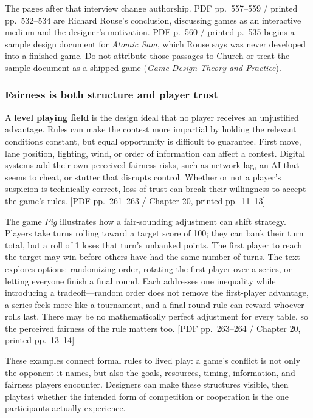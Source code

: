 The pages after that interview change authorship. PDF pp.~557--559 / printed pp.~532--534 are Richard Rouse's conclusion, discussing games as an interactive medium and the designer's motivation. PDF p.~560 / printed p.~535 begins a sample design document for \emph{Atomic Sam}, which Rouse says was never developed into a finished game. Do not attribute those passages to Church or treat the sample document as a shipped game (\emph{Game Design Theory and Practice}).

\subsubsection{Fairness is both structure and player trust}\label{05-engine-i-ch009-fairness-is-both-structure-and-player-trust}

A \textbf{level playing field} is the design ideal that no player receives an unjustified advantage. Rules can make the contest more impartial by holding the relevant conditions constant, but equal opportunity is difficult to guarantee. First move, lane position, lighting, wind, or order of information can affect a contest. Digital systems add their own perceived fairness risks, such as network lag, an AI that seems to cheat, or stutter that disrupts control. Whether or not a player's suspicion is technically correct, loss of trust can break their willingness to accept the game's rules. {[}PDF pp.~261--263 / Chapter 20, printed pp.~11--13{]}

The game \emph{Pig} illustrates how a fair-sounding adjustment can shift strategy. Players take turns rolling toward a target score of 100; they can bank their turn total, but a roll of 1 loses that turn's unbanked points. The first player to reach the target may win before others have had the same number of turns. The text explores options: randomizing order, rotating the first player over a series, or letting everyone finish a final round. Each addresses one inequality while introducing a tradeoff---random order does not remove the first-player advantage, a series feels more like a tournament, and a final-round rule can reward whoever rolls last. There may be no mathematically perfect adjustment for every table, so the perceived fairness of the rule matters too. {[}PDF pp.~263--264 / Chapter 20, printed pp.~13--14{]}

These examples connect formal rules to lived play: a game's conflict is not only the opponent it names, but also the goals, resources, timing, information, and fairness players encounter. Designers can make these structures visible, then playtest whether the intended form of competition or cooperation is the one participants actually experience.

